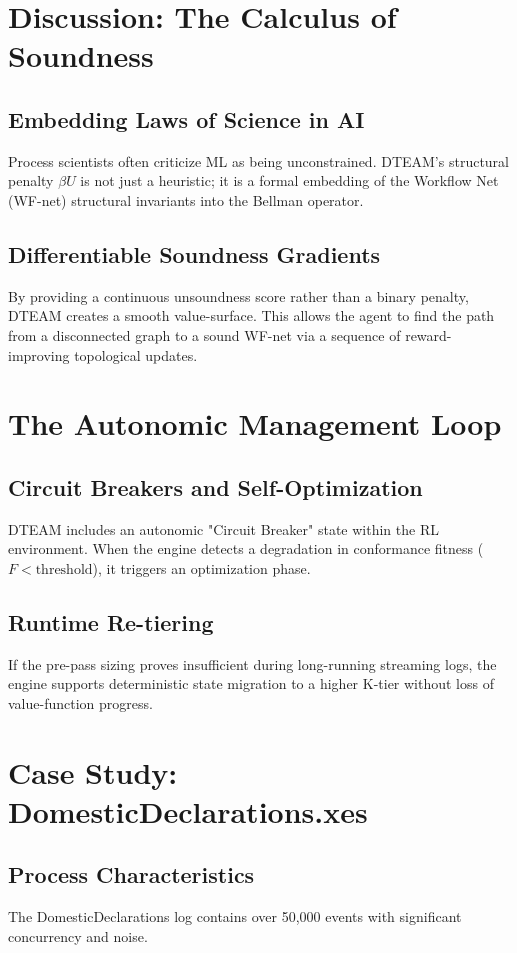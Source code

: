 \documentclass[12pt,a4paper]{report}
\begin{document}
\chapter{Discussion: The Calculus of Soundness}
\section{Embedding Laws of Science in AI}
Process scientists often criticize ML as being unconstrained. DTEAM's structural penalty $\beta U$ is not just a heuristic; it is a formal embedding of the Workflow Net (WF-net) structural invariants into the Bellman operator.

\section{Differentiable Soundness Gradients}
By providing a continuous unsoundness score rather than a binary penalty, DTEAM creates a smooth value-surface. This allows the agent to find the path from a disconnected graph to a sound WF-net via a sequence of reward-improving topological updates.

\chapter{The Autonomic Management Loop}
\section{Circuit Breakers and Self-Optimization}
DTEAM includes an autonomic "Circuit Breaker" state within the RL environment. When the engine detects a degradation in conformance fitness ($F < \text{threshold}$), it triggers an optimization phase.

\section{Runtime Re-tiering}
If the pre-pass sizing proves insufficient during long-running streaming logs, the engine supports deterministic state migration to a higher K-tier without loss of value-function progress.

\chapter{Case Study: DomesticDeclarations.xes}
\section{Process Characteristics}
The DomesticDeclarations log contains over 50,000 events with significant concurrency and noise. 
\end{document}
